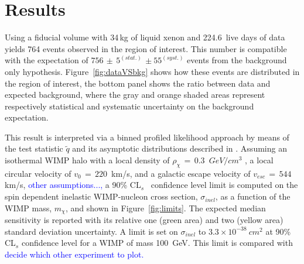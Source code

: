 \section{Results}
\label{sec:results}

Using a fiducial volume with 34\,kg of liquid xenon and 224.6~live days of data yields 764 events observed  in the region of interest.
This number is compatible with the expectation of $756 \, \pm \, 5^{(stat.)} \, \pm 55^{(syst.)}$ events from the background only hypothesis. 
Figure~\ref{fig:dataVSbkg} shows how these events are distributed in the region of interest, the bottom panel shows the ratio
between data and expected background, where the gray and orange shaded areas represent respectively statistical and systematic uncertainty 
on the background expectation.


This result is interpreted via a binned profiled likelihood approach by means of the test statistic $\tilde{q}$
and its asymptotic distributions described in \cite{asympt}. 
Assuming  an isothermal WIMP halo with a local density of $\rho_{\chi} \, = \, 0.3$~$GeV/cm^3$ , a local circular velocity of $v_0 \,= \, 220$~km/s, and a galactic escape velocity of $v_{esc} \, = \, 544$ km/s, 
\textcolor{blue}{other assumptions...,} a 90\% CL$_s$~\cite{cls} confidence level limit is  
computed on the spin dependent inelastic WIMP-nucleon cross section, $\sigma_{inel}$, as a function of the WIMP mass, $m_{\chi}$, and shown in Figure~\ref{fig:limits}.
The expected median sensitivity is reported with its relative one (green area) and two (yellow area) standard deviation uncertainty.
A  limit is set on $\sigma_{inel}$ to $3.3 \times 10^{-38} ~cm^{2}$ at 90\% CL$_s$ confidence level for a WIMP of mass 100~GeV. This limit is compared with
\textcolor{blue}{decide which other experiment to plot.}

